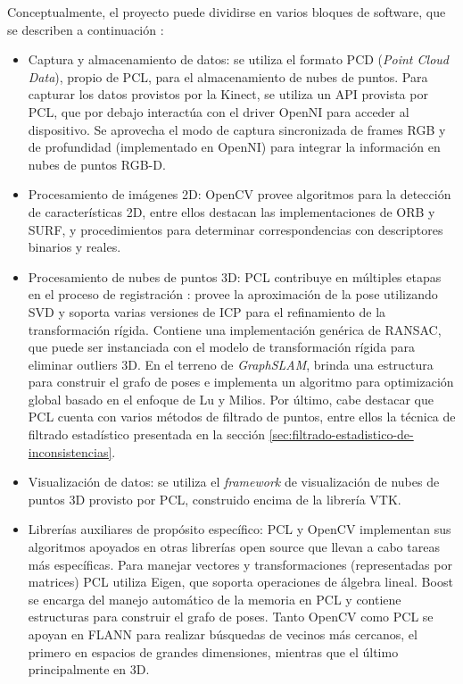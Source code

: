 Conceptualmente, el proyecto puede dividirse en varios bloques de software, que se describen a continuación :
\begin{itemize}

\item Captura y almacenamiento de datos: se utiliza el formato PCD (\textit{Point Cloud Data}), propio de PCL, para el almacenamiento de nubes de puntos. Para capturar los datos provistos por la Kinect, se utiliza un API provista por PCL, que por debajo interactúa con el driver OpenNI para acceder al dispositivo. Se aprovecha el modo de captura sincronizada de frames RGB y de profundidad (implementado en OpenNI) para integrar la información en nubes de puntos RGB-D.

\item Procesamiento de imágenes 2D: OpenCV provee algoritmos para la detección de características 2D, entre ellos destacan las implementaciones de ORB y SURF, y procedimientos para determinar correspondencias con descriptores binarios y reales.

\item Procesamiento de nubes de puntos 3D: PCL contribuye en múltiples etapas en el proceso de registración : provee la aproximación de la pose utilizando SVD y soporta varias versiones de ICP para el refinamiento de la transformación rígida. Contiene una implementación genérica de RANSAC, que puede ser instanciada con el modelo de transformación rígida para eliminar outliers 3D. En el terreno de \textit{GraphSLAM}, brinda una estructura para construir el grafo de poses e implementa un algoritmo para optimización global basado en el enfoque de Lu y Milios. Por último, cabe destacar que PCL cuenta con varios métodos de filtrado de puntos, entre ellos la técnica de filtrado estadístico presentada en la sección \ref{sec:filtrado-estadistico-de-inconsistencias}.

\item Visualización de datos: se utiliza el \textit{framework} de visualización de nubes de puntos 3D provisto por PCL, construido encima de la librería VTK.

\item Librerías auxiliares de propósito específico: PCL y OpenCV implementan sus algoritmos apoyados en otras librerías open source que llevan a cabo tareas más específicas. Para manejar vectores y transformaciones (representadas por matrices) PCL utiliza Eigen, que soporta operaciones de álgebra lineal. Boost se encarga del manejo automático de la memoria en PCL y contiene estructuras para construir el grafo de poses. Tanto OpenCV como PCL se apoyan en FLANN para realizar búsquedas de vecinos más cercanos, el primero en espacios de grandes dimensiones, mientras que el último principalmente en 3D.

\end{itemize}

